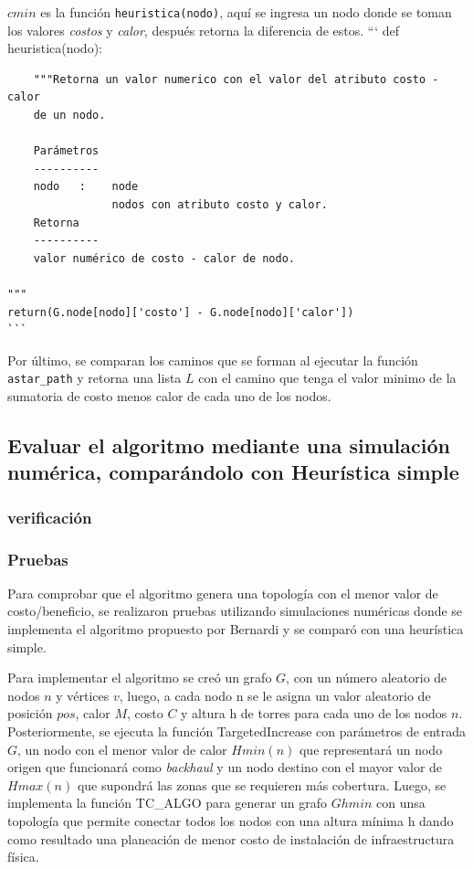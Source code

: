 \documentclass[]{article}
\begin{document}
\(cmin\) es la función \texttt{heuristica(nodo)}, aquí se ingresa un
nodo donde se toman los valores \emph{costos} y \emph{calor}, después
retorna la diferencia de estos. ``` def heuristica(nodo):

\begin{verbatim}
    """Retorna un valor numerico con el valor del atributo costo - calor 
    de un nodo. 
    
    Parámetros 
    ---------- 
    nodo   :    node 
                nodos con atributo costo y calor. 
    Retorna 
    ---------- 
    valor numérico de costo - calor de nodo. 

""" 
return(G.node[nodo]['costo'] - G.node[nodo]['calor']) 
``` 
\end{verbatim}

Por último, se comparan los caminos que se forman al ejecutar la función
\texttt{astar\_path} y retorna una lista \(L\) con el camino que tenga
el valor minimo de la sumatoria de costo menos calor de cada uno de los
nodos.

\subsection{Evaluar el algoritmo mediante una simulación numérica,
comparándolo con Heurística
simple}\label{evaluar-el-algoritmo-mediante-una-simulaciuxf3n-numuxe9rica-comparuxe1ndolo-con-heuruxedstica-simple}

\subsubsection{verificación}\label{verificaciuxf3n}

\subsubsection{Pruebas}\label{pruebas}

Para comprobar que el algoritmo genera una topología con el menor valor
de costo/beneficio, se realizaron pruebas utilizando simulaciones
numéricas donde se implementa el algoritmo propuesto por Bernardi y se
comparó con una heurística simple.

Para implementar el algoritmo se creó un grafo \(G\), con un número
aleatorio de nodos \(n\) y vértices \(v\), luego, a cada nodo n se le
asigna un valor aleatorio de posición \(pos\), calor \(M\), costo \(C\)
y altura h de torres para cada uno de los nodos \(n\). Posteriormente,
se ejecuta la función TargetedIncrease con parámetros de entrada \(G\),
un nodo con el menor valor de calor \(Hmin(n)\) que representará un nodo
origen que funcionará como \emph{backhaul} y un nodo destino con el
mayor valor de \(Hmax(n)\) que supondrá las zonas que se requieren más
cobertura. Luego, se implementa la función TC\_ALGO para generar un
grafo \(Ghmin\) con unsa topología que permite conectar todos los nodos
con una altura mínima h dando como resultado una planeación de menor
costo de instalación de infraestructura física.
\end{document}

